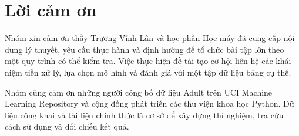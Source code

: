 \chapter*{Lời cảm ơn}
{}
Nhóm xin cảm ơn thầy Trương Vĩnh Lân và học phần Học máy đã cung cấp nội dung lý thuyết, yêu cầu thực hành và định hướng để tổ chức bài tập lớn theo một quy trình có thể kiểm tra. Việc thực hiện đề tài tạo cơ hội liên hệ các khái niệm tiền xử lý, lựa chọn mô hình và đánh giá với một tập dữ liệu bảng cụ thể.

Nhóm cũng cảm ơn những người công bố dữ liệu Adult trên UCI Machine Learning Repository và cộng đồng phát triển các thư viện khoa học Python. Dữ liệu công khai và tài liệu chính thức là cơ sở để xây dựng thí nghiệm, tra cứu cách sử dụng và đối chiếu kết quả.
